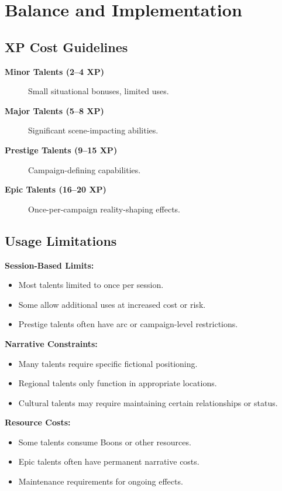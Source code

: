 \section{Balance and Implementation}
\label{sec:balance-implementation}

\subsection{XP Cost Guidelines}
\label{subsec:xp-guidelines}

\begin{description}
\item[\textbf{Minor Talents (2--4 XP)}] Small situational bonuses, limited uses.
\item[\textbf{Major Talents (5--8 XP)}] Significant scene-impacting abilities.
\item[\textbf{Prestige Talents (9--15 XP)}] Campaign-defining capabilities.
\item[\textbf{Epic Talents (16--20 XP)}] Once-per-campaign reality-shaping effects.
\end{description}

\subsection{Usage Limitations}
\label{subsec:usage-limitations}

\textbf{Session-Based Limits:}
\begin{itemize}
\item Most talents limited to once per session.
\item Some allow additional uses at increased cost or risk.
\item Prestige talents often have arc or campaign-level restrictions.
\end{itemize}

\textbf{Narrative Constraints:}
\begin{itemize}
\item Many talents require specific fictional positioning.
\item Regional talents only function in appropriate locations.
\item Cultural talents may require maintaining certain relationships or status.
\end{itemize}

\textbf{Resource Costs:}
\begin{itemize}
\item Some talents consume Boons or other resources.
\item Epic talents often have permanent narrative costs.
\item Maintenance requirements for ongoing effects.
\end{itemize}


